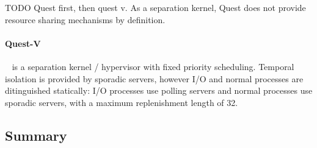 TODO Quest first, then quest v. 
As a separation kernel, Quest does not provide resource sharing mechanisms by definition. 

\paragraph{Quest-V}~\citep{Danish_LW_2011} is a separation kernel / hypervisor with fixed priority scheduling.
Temporal isolation is provided by sporadic servers, however I/O and normal processes are ditinguished statically: I/O processes use polling servers and normal processes use sporadic servers, with a maximum replenishment length of 32.


\subsection{Summary}


